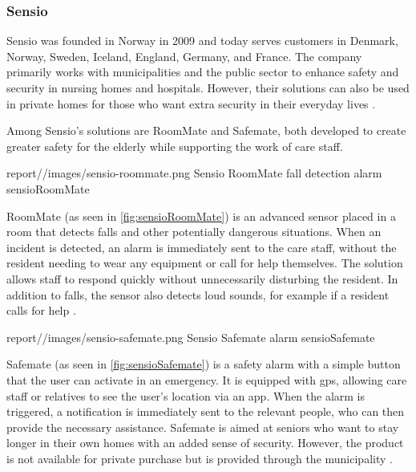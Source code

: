\subsubsection{Sensio}

Sensio was founded in Norway in 2009 and today serves customers in Denmark, Norway, Sweden, Iceland, England, Germany, and France.
The company primarily works with municipalities and the public sector to enhance safety and security in nursing homes and hospitals. However, their solutions can also be used in private homes for those who want extra security in their everyday lives \cite{noauthor_om_nodate}. 

Among Sensio’s solutions are RoomMate and Safemate, both developed to create greater safety for the elderly while supporting the work of care staff.



    {report//images/sensio-roommate.png}
    {Sensio RoomMate fall detection alarm}
    {sensioRoomMate}


RoomMate (as seen in \autoref{fig:sensioRoomMate}) is an advanced sensor placed in a room that detects falls and other potentially dangerous situations. When an incident is detected, an alarm is immediately sent to the care staff, without the resident needing to wear any equipment or call for help themselves. The solution allows staff to respond quickly without unnecessarily disturbing the resident. In addition to falls, the sensor also detects loud sounds, for example if a resident calls for help \cite{noauthor_roommate_nodate}.





    {report//images/sensio-safemate.png}
    {Sensio Safemate alarm}
    {sensioSafemate}


Safemate (as seen in \autoref{fig:sensioSafemate}) is a safety alarm with a simple button that the user can activate in an emergency. It is equipped with \gls{gps}, allowing care staff or relatives to see the user’s location via an app. When the alarm is triggered, a notification is immediately sent to the relevant people, who can then provide the necessary assistance. Safemate is aimed at seniors who want to stay longer in their own homes with an added sense of security. However, the product is not available for private purchase but is provided through the municipality \cite{noauthor_safemate_nodate}.
